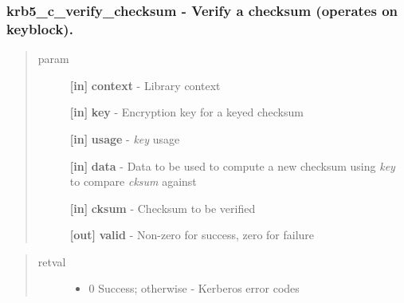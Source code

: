 \documentclass[letterpaper,10pt,english]{sphinxmanual}
\begin{document}
\subsubsection{krb5\_c\_verify\_checksum -  Verify a checksum (operates on keyblock).}
\label{appdev/refs/api/krb5_c_verify_checksum:krb5-c-verify-checksum-verify-a-checksum-operates-on-keyblock}\label{appdev/refs/api/krb5_c_verify_checksum::doc}

\begin{fulllineitems}
\label{appdev/refs/api/krb5_c_verify_checksum:krb5_c_verify_checksum}
\end{fulllineitems}

\begin{quote}\begin{description}
\item[{param}] \leavevmode
\textbf{{[}in{]}} \textbf{context} - Library context

\textbf{{[}in{]}} \textbf{key} - Encryption key for a keyed checksum

\textbf{{[}in{]}} \textbf{usage} - \emph{key} usage

\textbf{{[}in{]}} \textbf{data} - Data to be used to compute a new checksum using \emph{key} to compare \emph{cksum} against

\textbf{{[}in{]}} \textbf{cksum} - Checksum to be verified

\textbf{{[}out{]}} \textbf{valid} - Non-zero for success, zero for failure

\end{description}\end{quote}
\begin{quote}\begin{description}
\item[{retval}] \leavevmode\begin{itemize}
\item {} 
0   Success; otherwise - Kerberos error codes

\end{itemize}

\end{description}\end{quote}
\end{document}
